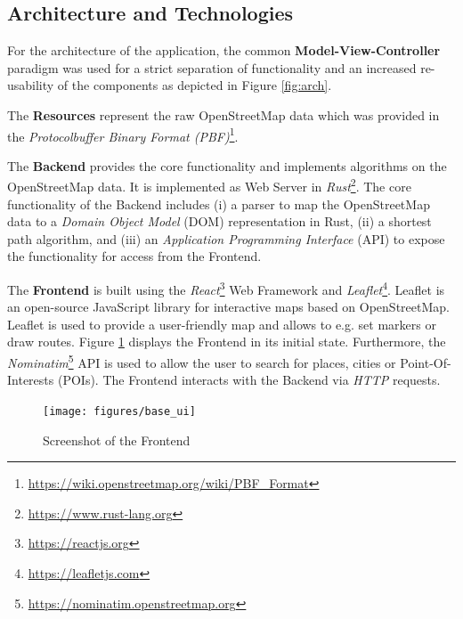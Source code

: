 \documentclass[a4paper]{article}
\begin{document}
\subsection{Architecture and Technologies}
For the architecture of the application, the common \textbf{Model-View-Controller} paradigm was used for a strict separation of functionality and an increased re-usability of the components as depicted in Figure \ref{fig:arch}.\par\medskip
The \textbf{Resources} represent the raw OpenStreetMap data which was provided in the \textit{Protocolbuffer Binary Format (PBF)}\footnote{\url{https://wiki.openstreetmap.org/wiki/PBF_Format}}.\par\medskip
The \textbf{Backend} provides the core functionality and implements algorithms on the OpenStreetMap data.
It is implemented as Web Server in \textit{Rust}\footnote{\url{https://www.rust-lang.org}}.
The core functionality of the Backend includes (i) a parser to map the OpenStreetMap data to a \textit{Domain Object Model} (DOM) representation in Rust,
(ii) a shortest path algorithm, and (iii) an \textit{Application Programming Interface} (API) to expose the functionality for access from the Frontend.\par\medskip
The \textbf{Frontend} is built using the \textit{React}\footnote{\url{https://reactjs.org}} Web Framework and \textit{Leaflet}\footnote{\url{https://leafletjs.com}}. Leaflet is an open-source JavaScript library for interactive maps based on OpenStreetMap.
Leaflet is used to provide a user-friendly map and allows to e.g. set markers or draw routes.
Figure \ref{fig:base_ui} displays the Frontend in its initial state.
Furthermore, the \textit{Nominatim}\footnote{\url{https://nominatim.openstreetmap.org}} API is used to allow the user to search for places, cities or Point-Of-Interests (POIs).
The Frontend interacts with the Backend via \textit{HTTP} requests.
\begin{figure}[h]
    \centering
    \texttt{[image: figures/base\_ui]}
    \caption{Screenshot of the Frontend}
    \label{fig:base_ui}
\end{figure}
\end{document}

